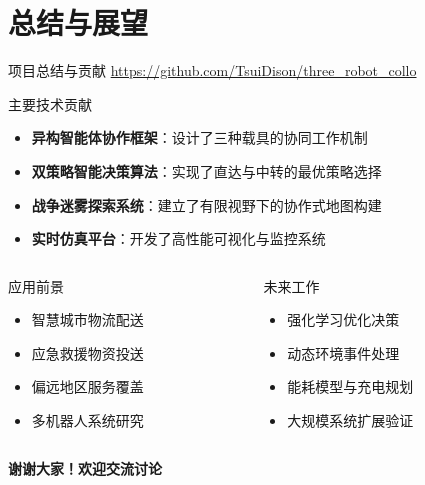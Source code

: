 \documentclass[
10pt,
aspectratio=169,
]{beamer}
\begin{document}
\section{总结与展望}

\begin{frame}{项目总结与贡献}
    \href{https://github.com/TsuiDison/three_robot_collo}{https://github.com/TsuiDison/three\_robot\_collo}
    \begin{block}{主要技术贡献}
        \begin{itemize}
            \item \textbf{异构智能体协作框架}：设计了三种载具的协同工作机制
            \item \textbf{双策略智能决策算法}：实现了直达与中转的最优策略选择
            \item \textbf{战争迷雾探索系统}：建立了有限视野下的协作式地图构建
            \item \textbf{实时仿真平台}：开发了高性能可视化与监控系统
        \end{itemize}
    \end{block}
    
    \begin{columns}
        \begin{column}{0.5\textwidth}
            \begin{exampleblock}{应用前景}
                \begin{itemize}
                    \item 智慧城市物流配送
                    \item 应急救援物资投送
                    \item 偏远地区服务覆盖
                    \item 多机器人系统研究
                \end{itemize}
            \end{exampleblock}
        \end{column}
        \begin{column}{0.5\textwidth}
            \begin{alertblock}{未来工作}
                \begin{itemize}
                    \item 强化学习优化决策
                    \item 动态环境事件处理
                    \item 能耗模型与充电规划
                    \item 大规模系统扩展验证
                \end{itemize}
            \end{alertblock}
        \end{column}
    \end{columns}
    
    \begin{center}
        \Large \textbf{谢谢大家！欢迎交流讨论}
    \end{center}
\end{frame}
\end{document}
